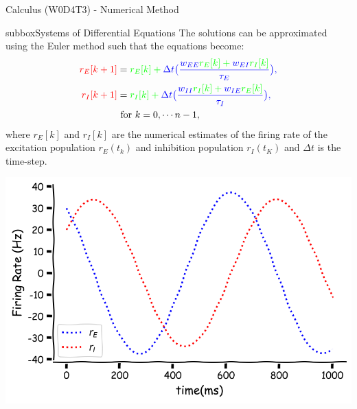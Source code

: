 \begin{textbox}{Calculus (W0D4T3) - Numerical Method}
\begin{subbox}{subbox}{Systems of Differential Equations}
The solutions can be approximated using the Euler method such that the equations become:
\begin{align*}
\color{red}{r_E[k+1]}&=\color{green}{r_E[k]}+\color{blue}{\Delta t}\big(\frac{\color{blue}{w_{EE}}\color{green}{r_E[k]}+\color{blue}{w_{EI}}\color{green}{r_I[k]}}{\color{blue}{\tau_E}}\big),\\
\color{red}{r_I[k+1]}&=\color{green}{r_I[k]}+\color{blue}{\Delta t}\big(\frac{\color{blue}{w_{II}}\color{green}{r_I[k]}+\color{blue}{w_{IE}}\color{green}{r_E[k]}}{\color{blue}{\tau_I}}\big),\\
&\text{ for } k=0, \cdots n-1,
\end{align*}
where $r_E[k]$ and $r_I[k]$ are the numerical estimates of the firing rate of the excitation population $r_E(t_k)$ and inhibition population $r_I(t_K)$ and $\Delta t$ is the time-step.

\centering
\includegraphics[scale=0.1]{Figures/PreCourse/CFigure9.png}
\end{subbox}
\end{textbox}

